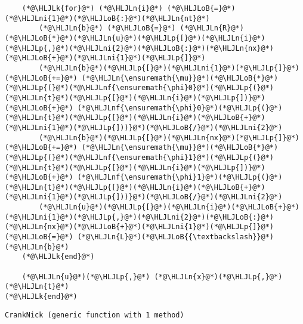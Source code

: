 \documentclass[12pt,a4paper]{article}
\newcommand{\HLJLk}[1]{\textcolor[RGB]{148,91,176}{\textbf{#1}}}
\newcommand{\HLJLn}[1]{#1}
\newcommand{\HLJLnf}[1]{\textcolor[RGB]{66,102,213}{#1}}
\newcommand{\HLJLni}[1]{\textcolor[RGB]{59,151,46}{#1}}
\newcommand{\HLJLoB}[1]{\textcolor[RGB]{102,102,102}{\textbf{#1}}}
\newcommand{\HLJLp}[1]{#1}
\begin{document}
\begin{lstlisting}
    (*@\HLJLk{for}@*) (*@\HLJLn{i}@*) (*@\HLJLoB{=}@*) (*@\HLJLni{1}@*)(*@\HLJLoB{:}@*)(*@\HLJLn{nt}@*)
        (*@\HLJLn{b}@*) (*@\HLJLoB{=}@*) (*@\HLJLn{R}@*)(*@\HLJLoB{*}@*)(*@\HLJLn{u}@*)(*@\HLJLp{[}@*)(*@\HLJLn{i}@*)(*@\HLJLp{,}@*)(*@\HLJLni{2}@*)(*@\HLJLoB{:}@*)(*@\HLJLn{nx}@*)(*@\HLJLoB{+}@*)(*@\HLJLni{1}@*)(*@\HLJLp{]}@*) 
        (*@\HLJLn{b}@*)(*@\HLJLp{[}@*)(*@\HLJLni{1}@*)(*@\HLJLp{]}@*) (*@\HLJLoB{+=}@*) (*@\HLJLn{\ensuremath{\mu}}@*)(*@\HLJLoB{*}@*)(*@\HLJLp{(}@*)(*@\HLJLnf{\ensuremath{\phi}0}@*)(*@\HLJLp{(}@*)(*@\HLJLn{t}@*)(*@\HLJLp{[}@*)(*@\HLJLn{i}@*)(*@\HLJLp{])}@*) (*@\HLJLoB{+}@*) (*@\HLJLnf{\ensuremath{\phi}0}@*)(*@\HLJLp{(}@*)(*@\HLJLn{t}@*)(*@\HLJLp{[}@*)(*@\HLJLn{i}@*)(*@\HLJLoB{+}@*)(*@\HLJLni{1}@*)(*@\HLJLp{]))}@*)(*@\HLJLoB{/}@*)(*@\HLJLni{2}@*)
        (*@\HLJLn{b}@*)(*@\HLJLp{[}@*)(*@\HLJLn{nx}@*)(*@\HLJLp{]}@*) (*@\HLJLoB{+=}@*) (*@\HLJLn{\ensuremath{\mu}}@*)(*@\HLJLoB{*}@*)(*@\HLJLp{(}@*)(*@\HLJLnf{\ensuremath{\phi}1}@*)(*@\HLJLp{(}@*)(*@\HLJLn{t}@*)(*@\HLJLp{[}@*)(*@\HLJLn{i}@*)(*@\HLJLp{])}@*) (*@\HLJLoB{+}@*) (*@\HLJLnf{\ensuremath{\phi}1}@*)(*@\HLJLp{(}@*)(*@\HLJLn{t}@*)(*@\HLJLp{[}@*)(*@\HLJLn{i}@*)(*@\HLJLoB{+}@*)(*@\HLJLni{1}@*)(*@\HLJLp{]))}@*)(*@\HLJLoB{/}@*)(*@\HLJLni{2}@*)
        (*@\HLJLn{u}@*)(*@\HLJLp{[}@*)(*@\HLJLn{i}@*)(*@\HLJLoB{+}@*)(*@\HLJLni{1}@*)(*@\HLJLp{,}@*)(*@\HLJLni{2}@*)(*@\HLJLoB{:}@*)(*@\HLJLn{nx}@*)(*@\HLJLoB{+}@*)(*@\HLJLni{1}@*)(*@\HLJLp{]}@*) (*@\HLJLoB{=}@*) (*@\HLJLn{L}@*)(*@\HLJLoB{{\textbackslash}}@*)(*@\HLJLn{b}@*)
    (*@\HLJLk{end}@*)
    
    (*@\HLJLn{u}@*)(*@\HLJLp{,}@*) (*@\HLJLn{x}@*)(*@\HLJLp{,}@*) (*@\HLJLn{t}@*)
(*@\HLJLk{end}@*)
\end{lstlisting}

\begin{lstlisting}
CrankNick (generic function with 1 method)
\end{lstlisting}
\end{document}
